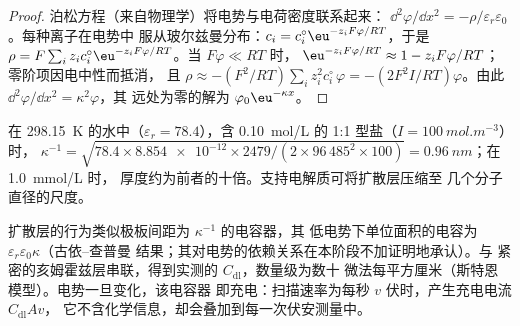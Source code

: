 \begin{proof}
泊松方程（来自物理学）将电势与电荷密度联系起来：
$\dd^2\varphi/\dd x^2 = -\rho/\varepsilon_r\varepsilon_0$。每种离子在电势中
服从玻尔兹曼分布：$c_i = c_i^{\circ}\eu^{-z_iF\varphi/RT}$，于是 $\rho = F\sum_iz_ic_i^{\circ}\eu^{-z_iF\varphi/RT}$。当 $F\varphi \ll RT$ 时，
$\eu^{-z_iF\varphi/RT} \approx 1 - z_iF\varphi/RT$；零阶项因电中性而抵消，
且 $\rho \approx -(F^2/RT)\sum_iz_i^2c_i^{\circ}\,\varphi = -(2F^2I/RT)\varphi$。由此 $\dd^2\varphi/\dd x^2 = \kappa^2\varphi$，其
远处为零的解为 $\varphi_0\eu^{-\kappa x}$。
\end{proof}

\begin{example}[双电层的厚度]\label{ex:b3:electrode-kinetics:debye}
在 \qty{298.15}{K} 的水中（$\varepsilon_r = 78.4$），含 \qty{0.10}{mol/L} 的 1:1 型盐（$I = \qty{100}{mol.m^{-3}}$）时，
$\kappa^{-1} = \sqrt{78.4 \times \num{8.854e-12} \times 2479/(2 \times 96\,485^2 \times 100)} = \qty{0.96}{nm}$；在 \qty{1.0}{mmol/L} 时，
厚度约为前者的十倍。支持电解质可将扩散层压缩至
几个分子直径的尺度。
\end{example}

扩散层的行为类似极板间距为 $\kappa^{-1}$ 的电容器，其
低电势下单位面积的电容为 $\varepsilon_r\varepsilon_0\kappa$（古依–查普曼
结果；其对电势的依赖关系在本阶段不加证明地承认）。与
紧密的亥姆霍兹层串联，得到实测的 $C_{\mathrm{dl}}$，数量级为数十
微法每平方厘米（斯特恩模型）。电势一旦变化，该电容器
即充电：扫描速率为每秒 $v$ 伏时，产生充电电流 $C_{\mathrm{dl}}Av$，
它不含化学信息，却会叠加到每一次伏安测量中。

